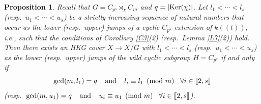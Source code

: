 \documentclass[11pt]{amsart}
\newtheorem{proposition}[theorem]{Proposition}
\def\Ker{\textup{Ker}}
\begin{document}
\begin{proposition}\label{P10}
Recall that $G=C_{p^s}\rtimes_\chi C_m$ and $q=|\Ker(\chi)|$. Let $l_1<\cdots<l_s$ (resp.\ $u_1<\cdots<u_s$) be a strictly increasing sequence of natural numbers that occur as the lower (resp.\ upper) jumps of a cyclic $C_{p^s}$-extension of $k((t))$, i.e., such that the conditions of Corollary \ref{C3}(2) (resp.\ Lemma \ref{L7}(2)) hold. Then there exists an HKG cover $X\rightarrow X/G$ with $l_1<\cdots<l_s$ (resp.\ $u_1<\cdots<u_s$) as the lower (resp.\ upper) jumps of the wild cyclic subgroup $H=C_{p^s}$ if and only if 
\begin{equation}\label{EQ61}
\gcd(m,l_1)=q\;\;\;\;\textup{and}\;\;\;\;l_i\equiv l_1\pmod m\;\;\;\forall i\in\llbracket2,s\rrbracket
\end{equation}
(resp.\ $\gcd(m,u_1)=q\;\;\;\;\textup{and}\;\;\;\;u_i\equiv u_1\pmod m\;\;\;\forall i\in\llbracket2,s\rrbracket$).
\end{proposition}
\end{document}
